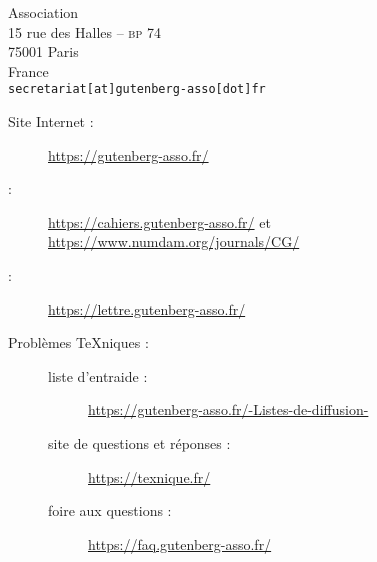 
 \enlargethispage{1.5cm}
 \scriptsize
 \vspace*{-1cm}
 \hspace*{-1.5cm}%
 \ExplSyntaxOn
 \ExplSyntaxOff
 \hfill%
 \begin{minipage}[t]{.5\textwidth}%
   \footnotesize\raggedleft%
   Association \gut{}\\
   15 rue des Halles -- \textsc{bp} 74\\
   75001 Paris\\
   France\\
   \nolinkurl{secretariat[at]gutenberg-asso[dot]fr}
 \end{minipage}%

\begin{description}
\item[Site Internet :] \url{https://gutenberg-asso.fr/}
\item[\Cahiers{} :] \url{https://cahiers.gutenberg-asso.fr/} et
  \url{https://www.numdam.org/journals/CG/}
\item[ :] \url{https://lettre.gutenberg-asso.fr/}
\item[Problèmes \TeX{}niques :]
  \leavevmode
  \begin{description}
  \item[liste d'entraide :]
    \url{https://gutenberg-asso.fr/-Listes-de-diffusion-}
  \item[site de questions et réponses :]
    \url{https://texnique.fr/}
  \item[foire aux questions :]
    \url{https://faq.gutenberg-asso.fr/}
  \end{description}
\end{description}


